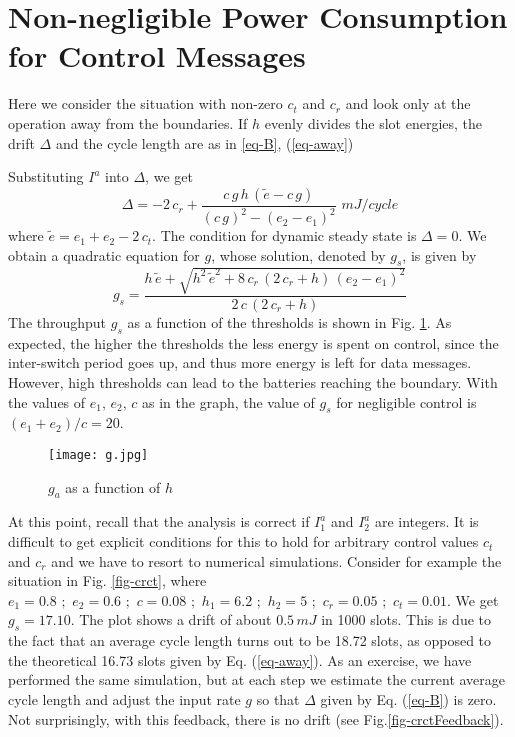 \documentclass[12 pt]{article}
\newcommand{\debug}[1]{\mbox{\tt #1}}
\renewcommand{\debug}[1]{}              \newcommand{\cmd}[1]{}
\newcommand{\2}{\>\>}
\newcommand{\3}{\>\>\>}
\newcommand{\4}{\>\>\>\>}
\newcommand{\5}{\>\>\>\>\>}
\newcommand{\6}{\>\>\>\>\>\>}
\newcommand{\7}{\6\>}
\newcommand{\8}{\6\2}
\newcommand{\EB}{\begin{equation}\cmd{EB}}
\newcommand{\EE}[1]{ \debug{\fbox{\sname #1}}\label{\sname #1} \end{equation}\cmd{EE} }
\newcommand{\sname}{}
\newcommand{\dref}[1]{\ref{#1}\debug{[#1]}\cmd{dref}}
\newcommand{\dlabelx}[1]{\debug{\fbox{\tiny #1}}\label{#1}}
\newcommand{\msec}[2]{\renewcommand{\sname}{}\section[#1
	\debug{\fbox {#2}}]{#1 \cmd{msec} \dlabelx{#2}}\markboth{\today}{Sec. \thesection}}
\begin{document}
\msec{Non-negligible Power Consumption for Control Messages}{nonnegligible}

Here we consider the situation with non-zero $c_t$ and $c_r$ and look only at the operation away from the boundaries.  If $h$ evenly divides the slot energies, the drift $\Delta$ and the cycle length are as in \dref{eq-B}, (\dref{eq-away})

Substituting $I^a$ into $\Delta$, we get
\EB
\Delta = -2\,c_r + \frac{c\,g\,h\,(\tilde{e} - c\,g)}{(c\,g)^2 - (e_2 - e_1)^2}\,\,mJ/cycle
\EE{eq-BD1}
where $\tilde{e} = e_1 + e_2 -2\,c_t$.
The condition for dynamic steady state is $\Delta = 0$.  We obtain a quadratic equation for $g$, whose solution, denoted by $g_s$, is given by
\EB
g_s = \frac{h\,\tilde{e}+\sqrt{h^2\,\tilde{e}^2 + 8\,c_r\,(2\,c_r+h)\,(e_2 - e_1)^2}}{2\,c\,(2\,c_r+h)}
\EE{eq-g}
The throughput $g_s$ as a function of the thresholds is shown in Fig. \dref{fig-g}.  As expected, the higher the thresholds the less energy is spent on control, since the inter-switch period goes up, and thus more energy is left for data messages.  However, high thresholds can lead to the batteries reaching the boundary.  With the values of $e_1,\,e_2,\,c$ as in the graph, the value of $g_s$ for negligible control is $(e_1+e_2)/c = 20$.

\begin{figure}[hbtp]
\begin{center}
\texttt{[image: g.jpg]}
\caption{$g_a$ as a function of $h$\debug{\fbox{fig-g}}\label{fig-g}}
\end{center}
\end{figure}

At this point, recall that the analysis is correct if $I_1^a$ and $I_2^a$ are integers.
It is difficult to get explicit conditions for this to hold for arbitrary control values $c_t$ and $c_r$ and we have to resort to numerical simulations.
Consider for example the situation in Fig. \dref{fig-crct}, where $e_1 = 0.8\,\,;\,\,e_2 = 0.6\,\,;\,\,c=0.08\,\,;\,\,h_1 = 6.2\,\,;\,\,h_2 = 5\,\,;\,\,c_r = 0.05\,\,;\,\,c_t = 0.01$.
We get $g_s = 17.10$.  The plot shows a drift of about $0.5\, mJ$ in 1000 slots.
This is due to the fact that an average cycle length turns out to be 18.72 slots, as opposed to the theoretical 16.73 slots given by Eq. (\dref{eq-away}).
As an exercise, we have performed the same simulation, but at each step we estimate the current average cycle length and adjust the input rate $g$ so that $\Delta$ given by Eq. (\dref{eq-B}) is zero.
Not surprisingly, with this feedback, there is no drift (see Fig.\dref{fig-crctFeedback}).
\end{document}
